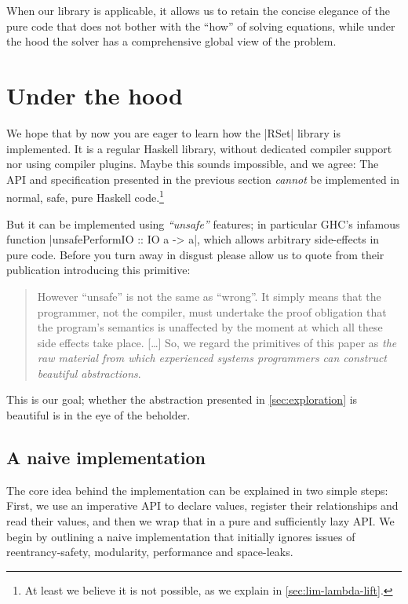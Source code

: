 \documentclass[manuscript,review,screen,acmsmall]{acmart}
\begin{document}
When our library is applicable, it allows us to retain the concise elegance of the pure code that does not bother with the “how” of solving equations, while under the hood the solver has a comprehensive global view of the problem.


\section{Under the hood}\label{sec:impl}

We hope that by now you are eager to learn how the |RSet| library is implemented. It is a regular Haskell library, without dedicated compiler support nor using compiler plugins. Maybe this sounds impossible, and we agree: The API and specification presented in the previous section \emph{cannot} be implemented in normal, safe, pure Haskell code.\footnote{At least we believe it is not possible, as we explain in \cref{sec:lim-lambda-lift}.}

But it can be implemented using \emph{“unsafe”} features; in particular GHC's infamous function |unsafePerformIO :: IO a -> a|, which allows arbitrary side-effects in pure code. Before you turn away in disgust please allow us to quote \citet{unsafePerformIO} from their publication introducing this primitive:
\begin{quote}
However “unsafe” is not the same as “wrong”. It simply means that the programmer, not the compiler, must undertake the proof obligation that the program's semantics is unaffected by the moment at which all these side effects take place. [\ldots]
So, we regard the primitives of this paper as \emph{the raw material from which experienced systems programmers can construct beautiful abstractions}.
\end{quote}
This is our goal; whether the abstraction presented in \cref{sec:exploration} is beautiful is in the eye of the beholder.

\subsection{A naive implementation}

The core idea behind the implementation can be explained in two simple steps: First, we use an imperative API to declare values, register their relationships and read their values, and then we wrap that in a pure and sufficiently lazy API. We begin by outlining a naive implementation that initially ignores issues of reentrancy-safety, modularity, performance and space-leaks.
\end{document}
